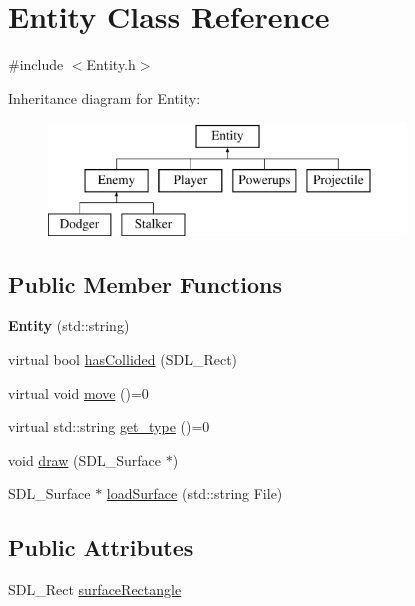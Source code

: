 \hypertarget{class_entity}{\section{\-Entity \-Class \-Reference}
\label{class_entity}
}


{\ttfamily \#include $<$\-Entity.\-h$>$}

\-Inheritance diagram for \-Entity\-:\begin{figure}[H]
\begin{center}
\leavevmode
\includegraphics[height=3.000000cm]{class_entity}
\end{center}
\end{figure}
\subsection*{\-Public \-Member \-Functions}
\begin{DoxyCompactItemize}
\item 
\hypertarget{class_entity_a0b902cfd7aafd6e04d109cb114165df6}{{\bfseries \-Entity} (std\-::string)}\label{class_entity_a0b902cfd7aafd6e04d109cb114165df6}

\item 
virtual bool \hyperlink{class_entity_a61d3e4674a5181d05ee02c2da761cf4f}{has\-Collided} (\-S\-D\-L\-\_\-\-Rect)
\item 
virtual void \hyperlink{class_entity_a473d9e253b279ecdf2ecc2f64882832e}{move} ()=0
\item 
virtual std\-::string \hyperlink{class_entity_a877e55ac2746451c89a07e35c318e544}{get\-\_\-type} ()=0
\item 
void \hyperlink{class_entity_a9cba0d0d4c25bd64d389ad432988b17b}{draw} (\-S\-D\-L\-\_\-\-Surface $\ast$)
\item 
\-S\-D\-L\-\_\-\-Surface $\ast$ \hyperlink{class_entity_a999e23a1ae72583fc9fc215393dcb631}{load\-Surface} (std\-::string \-File)
\end{DoxyCompactItemize}
\subsection*{\-Public \-Attributes}
\begin{DoxyCompactItemize}
\item 
\-S\-D\-L\-\_\-\-Rect \hyperlink{class_entity_ae1866f99a31f291b023356d8ababfa12}{surface\-Rectangle}
\end{DoxyCompactItemize}
